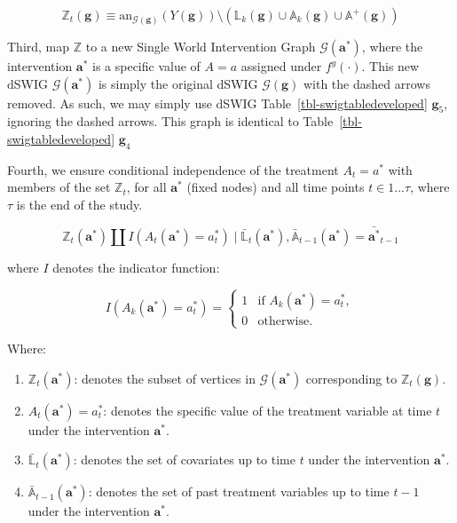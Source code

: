\documentclass[
  single column]{article}
\providecommand{\tightlist}{%
  \setlength{\itemsep}{0pt}\setlength{\parskip}{0pt}}\usepackage{longtable,booktabs,array}
\begin{document}
\[
\mathbb{Z}_t(\mathbf{g}) \equiv \text{an}_{\mathcal{G}(\mathbf{g})}(Y(\mathbf{g})) \setminus (\mathbb{L}_k(\mathbf{g}) \cup \mathbb{A}_k(\mathbf{g}) \cup \mathbb{A}^+(\mathbf{g}))
\]

Third, map \(\mathbb{Z}\) to a new Single World Intervention Graph
\(\mathcal{G}(\mathbf{a}^*)\), where the intervention \(\mathbf{a}^*\)
is a specific value of \(A = a\) assigned under \(f^g(\cdot)\). This new
dSWIG \(\mathcal{G}(\mathbf{a}^*)\) is simply the original dSWIG
\(\mathcal{G}(\mathbf{g})\) with the dashed arrows removed. As such, we
may simply use dSWIG Table~\ref{tbl-swigtabledeveloped}
\(\mathbf{g}_5\), ignoring the dashed arrows. This graph is identical to
Table~\ref{tbl-swigtabledeveloped} \(\mathbf{g}_4\)

Fourth, we ensure conditional independence of the treatment
\(A_t = a^*\) with members of the set \(\mathbb{Z}_t\), for all
\(\mathbf{a}^*\) (fixed nodes) and all time points \(t \in 1...\tau\),
where \(\tau\) is the end of the study.

\[
\mathbb{Z}_t(\mathbf{a}^*) \coprod I(A_t(\mathbf{a}^*) = a^*_t) \mid \bar{\mathbb{L}}_t(\mathbf{a}^*), \bar{\mathbb{A}}_{t-1}(\mathbf{a}^*) = \bar{\mathbf{a}^*}_{t-1}
\]

where \(I\) denotes the indicator function:

\[
I(A_k(\mathbf{a}^*) = a^*_t) = 
\begin{cases} 
1 & \text{if } A_k(\mathbf{a}^*) = a^*_t, \\
0 & \text{otherwise}.
\end{cases}
\]

Where:

\begin{enumerate}
\def\labelenumi{\arabic{enumi}.}
\tightlist
\item
  \textbf{\(\mathbb{Z}_t(\mathbf{a}^*)\)}: denotes the subset of
  vertices in \(\mathcal{G}(\mathbf{a}^*)\) corresponding to
  \(\mathbb{Z}_t(\mathbf{g})\).
\item
  \textbf{\(A_t(\mathbf{a}^*) = a^*_t\)}: denotes the specific value of
  the treatment variable at time \(t\) under the intervention
  \(\mathbf{a}^*\).
\item
  \textbf{\(\bar{\mathbb{L}}_t(\mathbf{a}^*)\)}: denotes the set of
  covariates up to time \(t\) under the intervention \(\mathbf{a}^*\).
\item
  \textbf{\(\bar{\mathbb{A}}_{t-1}(\mathbf{a}^*)\)}: denotes the set of
  past treatment variables up to time \(t-1\) under the intervention
  \(\mathbf{a}^*\).
\end{enumerate}
\end{document}
